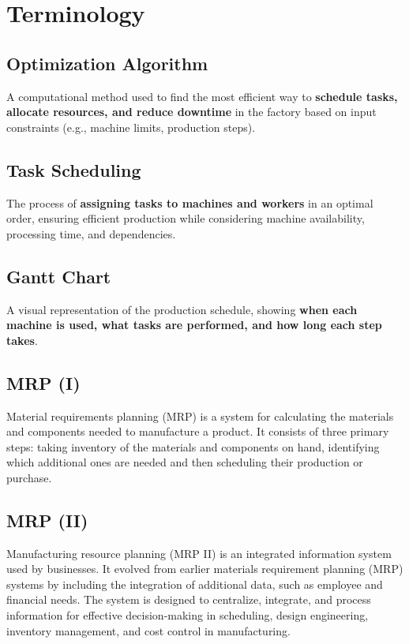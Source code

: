\section{Terminology}
\label{section:terminology}

\subsection{Optimization Algorithm}
A computational method used to find the most efficient way to \textbf{schedule tasks, allocate resources, and reduce downtime} in the factory based on input constraints (e.g., machine limits, production steps).  

\subsection{Task Scheduling}
The process of \textbf{assigning tasks to machines and workers} in an optimal order, ensuring efficient production while considering machine availability, processing time, and dependencies.

\subsection{Gantt Chart}
A visual representation of the production schedule, showing \textbf{when each machine is used, what tasks are performed, and how long each step takes}.

\subsection{MRP (I)} Material requirements planning (MRP) is a system for calculating the materials and components needed to manufacture a product. It consists of three primary steps: taking inventory of the materials and components on hand, identifying which additional ones are needed and then scheduling their production or purchase. \cite{techtarget_mrp}

\subsection{MRP (II)} Manufacturing resource planning (MRP II) is an integrated information system used by businesses. It evolved from earlier materials requirement planning (MRP) systems by including the integration of additional data, such as employee and financial needs. The system is designed to centralize, integrate, and process information for effective decision-making in scheduling, design engineering, inventory management, and cost control in manufacturing. \cite{investopedia_mrpii}

